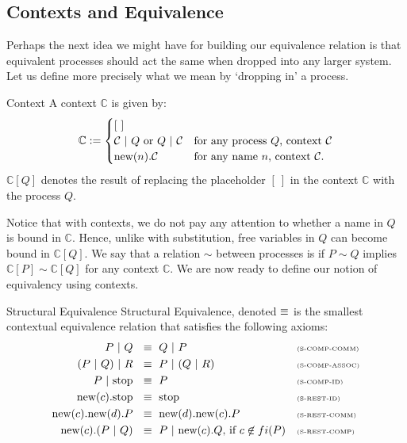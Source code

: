 \subsection{Contexts and Equivalence}
Perhaps the next idea we might have for building our equivalence relation is that equivalent processes should act the same when dropped into any larger system.  Let us define more precisely what we mean by `dropping in' a process.
\begin{definition}{Context}
	A context $\mathbb{C}$ is given by:
	\[
		\mathbb{C} := \begin{cases}
		[\ ]\\
		\mathcal{C} \ |\  Q \text{ or } Q \ |\  \mathcal{C} & \text{for any process $Q$, context $\mathcal{C}$}\\
		\text{new}({n}).\mathcal{C} & \text{for any name $n$, context $\mathcal{C}$}.
		\end{cases}
	\]
	$\mathbb{C}[Q]$ denotes the result of replacing the placeholder $[\ ]$ in the context $\mathbb{C}$ with the process $Q$.
	\end{definition}
	Notice that with contexts, we do not pay any attention to whether a name in $Q$ is bound in $\mathbb{C}$.  Hence, unlike with substitution, free variables in $Q$ can become bound in $\mathbb{C}[Q]$.  We say that a relation $\sim$ between processes is  if $P\sim Q$ implies $\mathbb{C}[P]\sim \mathbb{C}[Q]$ for any context $\mathbb{C}$.  We are now ready to define our notion of equivalency using contexts.
	\begin{definition}{Structural Equivalence}
		Structural Equivalence, denoted $\equiv$ is the smallest contextual equivalence relation that satisfies the following axioms:
		\begin{align*}
			P \ |\  Q\ &\  \equiv\  Q \ |\  P && \text{\tiny{(S-COMP-COMM)}}\\
		 	(P \ |\  Q) \ |\  R\ &\ \equiv\ P \ |\  (Q \ |\  R) && \text{\tiny{(S-COMP-ASSOC)}}\\
			P \ |\  \text{stop}\ &\ \equiv\ P && \text{\tiny{(S-COMP-ID)}}\\
			\text{new}({c}). \text{stop}\ &\ \equiv\ \text{stop} && \text{\tiny{(S-REST-ID)}}\\
			\text{new}({c}).\text{new}({d}). P \ &\ \equiv\ \text{new}({d}).\text{new}({c}). P && \text{\tiny{(S-REST-COMM)}}\\
			\text{new}({c}).(P \ |\  Q)\ &\ \equiv\  P \ |\  \text{new}({c}).Q\text{, if } c\not\in fi(P) && \text{\tiny{(S-REST-COMP)}}
		\end{align*}
	\end{definition}
